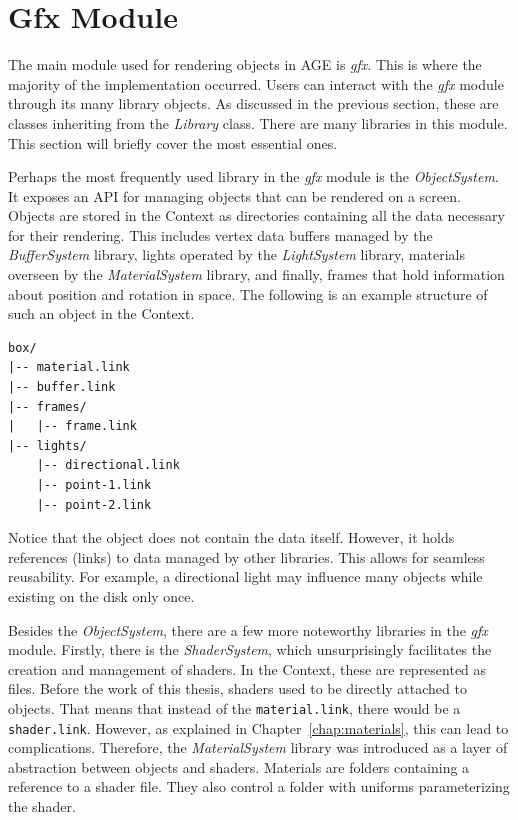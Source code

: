 \documentclass[
  digital,     %
  oneside,     %
  nosansbold,  %
  nocolorbold, %
  lof,         %
  lot,         %
]{fithesis4}
\begin{document}
\section{Gfx Module}
The main module used for rendering objects in AGE is \textit{gfx}.
This is where the majority of the implementation occurred. Users can interact with the
\textit{gfx} module through its many library objects. As discussed in the previous section,
these are classes inheriting from the \textit{Library} class. There are many
libraries in this module. This section will briefly cover the most essential ones.

Perhaps the most frequently used library in the \textit{gfx} module is the \textit{ObjectSystem}.
It exposes an API for managing objects that can be rendered on a screen.
Objects are stored in the Context as directories containing all the data
necessary for their rendering. This includes vertex data buffers managed by the \textit{BufferSystem} library,
lights operated by the \textit{LightSystem} library, materials overseen by the \textit{MaterialSystem} library,
and finally, frames that hold information about position and rotation in space.
The following is an example structure of such an object in the Context.
\begin{verbatim}
box/
|-- material.link
|-- buffer.link
|-- frames/
|   |-- frame.link
|-- lights/
    |-- directional.link
    |-- point-1.link
    |-- point-2.link
\end{verbatim}


Notice that the object does not contain the data itself. However, it holds references (links) to data managed by other
libraries. This allows for seamless reusability. For example, a directional light may influence many objects
while existing on the disk only once.

Besides the \textit{ObjectSystem}, there are a few more noteworthy libraries in the \textit{gfx} module.
Firstly, there is the \textit{ShaderSystem}, which unsurprisingly facilitates the creation and management
of shaders. In the Context, these are represented as files.
Before the work of this thesis, shaders used to be directly attached to objects.
That means that instead of the \verb|material.link|, there would be a \verb|shader.link|.
However, as explained in Chapter~\ref{chap:materials}, this can lead to complications. Therefore,
the \textit{MaterialSystem} library was introduced as a layer of abstraction between objects and shaders.
Materials are folders containing a reference to a shader file. They also control a folder with uniforms
parameterizing the shader.
\end{document}
